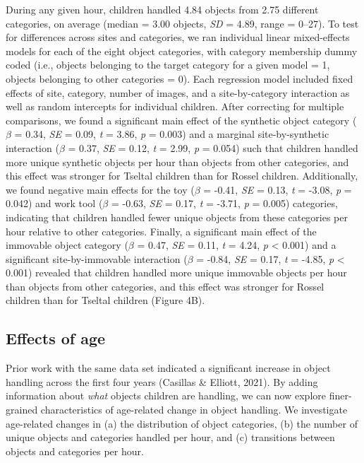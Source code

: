 \documentclass[10pt, letterpaper]{article}
\begin{document}
During any given hour, children handled 4.84 objects from 2.75 different
categories, on average (median = 3.00 objects, \emph{SD} = 4.89, range =
0--27). To test for differences across sites and categories, we ran
individual linear mixed-effects models for each of the eight object
categories, with category membership dummy coded (i.e., objects
belonging to the target category for a given model = 1, objects
belonging to other categories = 0). Each regression model included fixed
effects of site, category, number of images, and a site-by-category
interaction as well as random intercepts for individual children. After
correcting for multiple comparisons, we found a significant main effect
of the synthetic object category (\(\beta\) = 0.34, \emph{SE} = 0.09,
\emph{t} = 3.86, \emph{p} = 0.003) and a marginal site-by-synthetic
interaction (\(\beta\) = 0.37, \emph{SE} = 0.12, \emph{t} = 2.99,
\emph{p} = 0.054) such that children handled more unique synthetic
objects per hour than objects from other categories, and this effect was
stronger for Tseltal children than for Rossel children. Additionally, we
found negative main effects for the toy (\(\beta\) = -0.41, \emph{SE} =
0.13, \emph{t} = -3.08, \emph{p} = 0.042) and work tool (\(\beta\) =
-0.63, \emph{SE} = 0.17, \emph{t} = -3.71, \emph{p} = 0.005) categories,
indicating that children handled fewer unique objects from these
categories per hour relative to other categories. Finally, a significant
main effect of the immovable object category (\(\beta\) = 0.47,
\emph{SE} = 0.11, \emph{t} = 4.24, \emph{p} \textless{} 0.001) and a
significant site-by-immovable interaction (\(\beta\) = -0.84, \emph{SE}
= 0.17, \emph{t} = -4.85, \emph{p} \textless{} 0.001) revealed that
children handled more unique immovable objects per hour than objects
from other categories, and this effect was stronger for Rossel children
than for Tseltal children (Figure 4B).

\hypertarget{effects-of-age}{%
\subsection{Effects of age}\label{effects-of-age}}

Prior work with the same data set indicated a significant increase in
object handling across the first four years (Casillas \& Elliott, 2021).
By adding information about \emph{what} objects children are handling,
we can now explore finer-grained characteristics of age-related change
in object handling. We investigate age-related changes in (a) the
distribution of object categories, (b) the number of unique objects and
categories handled per hour, and (c) transitions between objects and
categories per hour.
\end{document}
